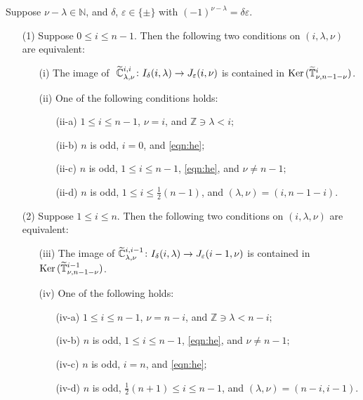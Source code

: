 \begin{proposition}
\label{prop:10.34}
Suppose $\nu-\lambda \in {\mathbb{N}}$, 
 and $\delta$, $\varepsilon \in \{\pm\}$
 with $(-1)^{\nu-\lambda} = \delta \varepsilon$.  
\begin{enumerate}
\item[{\rm{(1)}}]
Suppose $0 \le i \le n-1$.  
Then the following two conditions on $(i, \lambda,\nu)$ are equivalent:
\begin{enumerate}
\item[{\rm{(i)}}]
The image of 
$\hphantom{i}
   \widetilde{{\mathbb{C}}}_{{\lambda},{\nu}}^{{i,i}} \colon I_{\delta}(i,\lambda) \to J_{\varepsilon}(i,\nu)
$
 is contained in ${\operatorname{Ker}}\,(\widetilde{{\mathbb{T}}}_{{\nu},{n-1-\nu}}^{{i}})$.  
\item[{\rm{(ii)}}]
One of the following conditions holds:
\begin{enumerate}
\item[{\rm{(ii-a)}}]
$1 \le i \le n-1$, $\nu=i$, and ${\mathbb{Z}} \ni \lambda < i;$
\item[{\rm{(ii-b)}}]
$n$ is odd, $i=0$, and \eqref{eqn:he}$;$
\item[{\rm{(ii-c)}}]
$n$ is odd, $1 \le i \le n-1$, \eqref{eqn:he}, 
 and $\nu \ne n-1;$
\item[{\rm{(ii-d)}}]
$n$ is odd, $1 \le i \le \frac 1 2(n-1)$, 
 and $(\lambda,\nu) = (i,n-1-i)$.  
\end{enumerate}
\end{enumerate}
\item[{\rm{(2)}}]
Suppose $1 \le i \le n$.  
Then the following two conditions on $(i, \lambda,\nu)$ are equivalent:
\begin{enumerate}
\item[{\rm{(iii)}}]
The image of 
$
   \widetilde{{\mathbb{C}}}_{{\lambda},{\nu}}^{{i,i-1}} \colon I_{\delta}(i,\lambda) \to J_{\varepsilon}(i-1,\nu)
$
 is contained in ${\operatorname{Ker}}\,(\widetilde{{\mathbb{T}}}_{{\nu},{n-1-\nu}}^{{i-1}})$.  
\item[{\rm{(iv)}}]
One of the following holds:
\begin{enumerate}
\item[{\rm{(iv-a)}}]
$1 \le i \le n-1$, $\nu=n-i$, and ${\mathbb{Z}} \ni \lambda < n-i;$
\item[{\rm{(iv-b)}}]
$n$ is odd, $1 \le i \le n-1$, \eqref{eqn:he}, 
 and $\nu \ne n-1;$
\item[{\rm{(iv-c)}}]
$n$ is odd, $i=n$, and \eqref{eqn:he}$;$
\item[{\rm{(iv-d)}}]
$n$ is odd, $\frac 12 (n+1) \le i \le n-1$, 
 and $(\lambda,\nu) = (n-i,i-1)$.  
\end{enumerate}
\end{enumerate}
\end{enumerate}
\end{proposition}
